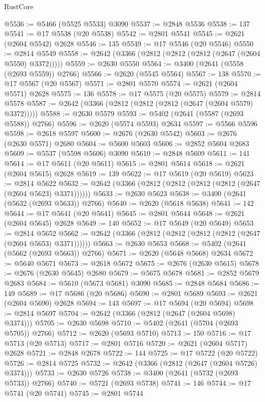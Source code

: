 \begin{lexlean}{RustCore}
\begin{coremodule}
@5536 := @5466 (@5525 @5533) @3090
@5537 := @2848 @5536
@5538 := 137
@5541 := @17 @5538 (@20 @5538)
@5542 := @2801 @5541
@5545 := @2621 (@2604 @5542) @2628
@5546 := 135
@5549 := @17 @5546 (@20 @5546)
@5550 := @2814 @5549
@5558 := @2642 (@3366 (@2812 (@2812 (@2812 (@2647 (@2604 @5550) @3372)))))
@5559 := @2630 @5550
@5564 := @3400 (@2641 (@5558 (@2693 @5559)) @2766)
@5566 := @2620 (@5545 @5564)
@5567 := 138
@5570 := @17 @5567 (@20 @5567)
@5571 := @2801 @5570
@5574 := @2621 (@2604 @5571) @2628
@5575 := 136
@5578 := @17 @5575 (@20 @5575)
@5579 := @2814 @5578
@5587 := @2642 (@3366 (@2812 (@2812 (@2812 (@2647 (@2604 @5579) @3372)))))
@5588 := @2630 @5579
@5593 := @5402 (@2641 (@5587 (@2693 @5588)) @2766)
@5596 := @2620 (@5574 @5593) @2634
@5597 := @5566 @5596
@5598 := @2618 @5597
@5600 := @2676 (@2630 @5542)
@5603 := @2676 (@2630 @5571) @2680
@5604 := @5600 @5603
@5606 := @2852 @5604 @2683
@5609 := @5537 (@5598 @5606) @3090
@5610 := @2848 @5609
@5611 := 141
@5614 := @17 @5611 (@20 @5611)
@5615 := @2801 @5614
@5618 := @2621 (@2604 @5615) @2628
@5619 := 139
@5622 := @17 @5619 (@20 @5619)
@5623 := @2814 @5622
@5632 := @2642 (@3366 (@2812 (@2812 (@2812 (@2812 (@2647 (@2604 @5623) @3371))))))
@5633 := @2630 @5623
@5638 := @3400 (@2641 (@5632 (@2693 @5633)) @2766)
@5640 := @2620 (@5618 @5638)
@5641 := 142
@5644 := @17 @5641 (@20 @5641)
@5645 := @2801 @5644
@5648 := @2621 (@2604 @5645) @2628
@5649 := 140
@5652 := @17 @5649 (@20 @5649)
@5653 := @2814 @5652
@5662 := @2642 (@3366 (@2812 (@2812 (@2812 (@2812 (@2647 (@2604 @5653) @3371))))))
@5663 := @2630 @5653
@5668 := @5402 (@2641 (@5662 (@2693 @5663)) @2766)
@5671 := @2620 (@5648 @5668) @2634
@5672 := @5640 @5671
@5673 := @2618 @5672
@5675 := @2676 (@2630 @5615)
@5678 := @2676 (@2630 @5645) @2680
@5679 := @5675 @5678
@5681 := @2852 @5679 @2683
@5684 := @5610 (@5673 @5681) @3090
@5685 := @2848 @5684
@5686 := 149
@5689 := @17 @5686 (@20 @5686)
@5690 := @2801 @5689
@5693 := @2621 (@2604 @5690) @2628
@5694 := 143
@5697 := @17 @5694 (@20 @5694)
@5698 := @2814 @5697
@5704 := @2642 (@3366 (@2812 (@2647 (@2604 @5698) @3374)))
@5705 := @2630 @5698
@5710 := @5402 (@2641 (@5704 (@2693 @5705)) @2766)
@5712 := @2620 (@5693 @5710)
@5713 := 150
@5716 := @17 @5713 (@20 @5713)
@5717 := @2801 @5716
@5720 := @2621 (@2604 @5717) @2628
@5721 := @2848 @2678
@5722 := 144
@5725 := @17 @5722 (@20 @5722)
@5726 := @2814 @5725
@5732 := @2642 (@3366 (@2812 (@2647 (@2604 @5726) @3374)))
@5733 := @2630 @5726
@5738 := @3400 (@2641 (@5732 (@2693 @5733)) @2766)
@5740 := @5721 (@2693 @5738)
@5741 := 146
@5744 := @17 @5741 (@20 @5741)
@5745 := @2801 @5744

\end{coremodule}
\end{lexlean}
